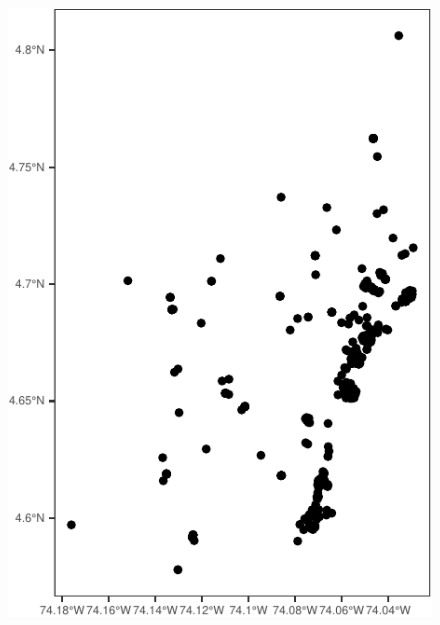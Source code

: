 \documentclass[
  shownotes,
  xcolor={svgnames},
  hyperref={colorlinks,citecolor=DarkBlue,linkcolor=DarkRed,urlcolor=DarkBlue}
   , aspectratio=169]{beamer}
\begin{document}
\begin{frame}[fragile]
\begin{minipage}[t]{0.52\linewidth}
\begin{scriptsize}
        \end{scriptsize}
    \end{minipage}
    \hfill
    \begin{minipage}[t]{0.43\linewidth}%
        \begin{figure}[H] \centering
            \captionsetup{justification=centering}  
            \includegraphics[scale=0.6]{figures/unnamed-chunk-1-1.pdf}
    \end{figure}
    \end{minipage}



\end{frame}
\end{document}
